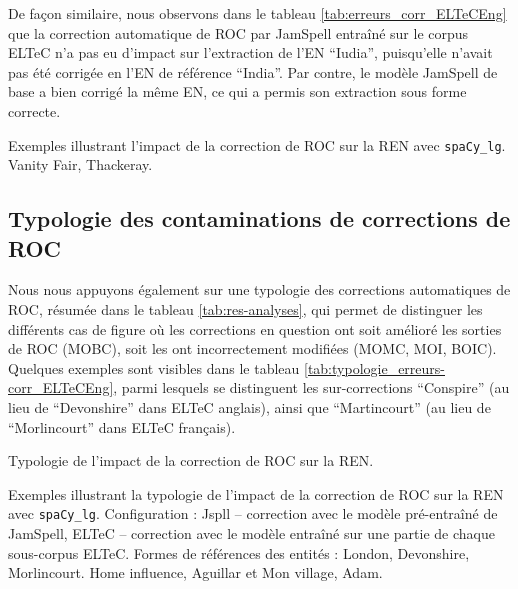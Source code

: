 De façon similaire, nous observons dans le tableau \ref{tab:erreurs_corr_ELTeCEng} que la correction automatique de ROC par JamSpell entraîné sur le corpus ELTeC n'a pas eu d'impact sur l'extraction de l'EN ``Iudia'', puisqu'elle n'avait pas été corrigée en l'EN de référence ``India''. Par contre, le modèle JamSpell de base a bien corrigé la même EN, ce qui a permis son extraction sous forme correcte.
\begin{table}[h!]
\small
    \centering
   
    \caption{Exemples illustrant l'impact de la correction de ROC sur la REN avec \texttt{spaCy\_lg}. {\normalfont Vanity Fair}, Thackeray.}
    \label{tab:erreurs_corr_ELTeCEng}
\end{table}


\subsection{Typologie des contaminations de corrections de ROC}
Nous nous appuyons également sur une typologie des corrections automatiques de ROC, résumée dans le tableau \ref{tab:res-analyses}, qui permet de distinguer les différents cas de figure où les corrections en question ont soit amélioré les sorties de ROC (MOBC), soit les ont incorrectement modifiées (MOMC, MOI, BOIC). Quelques exemples sont visibles dans le tableau \ref{tab:typologie_erreurs-corr_ELTeCEng}, 
parmi lesquels se distinguent les sur-corrections ``Conspire'' 
(au lieu de ``Devonshire'' 
dans ELTeC anglais), ainsi que ``Martincourt'' (au lieu de ``Morlincourt'' dans ELTeC français).



\begin{table}[h!]
\small
    \centering
    
    \caption{Typologie de l'impact de la correction de ROC sur la REN.  }
    \label{tab:res-analyses}
\end{table}

\begin{table}[h!]
\small
    \centering
   
    \caption{Exemples illustrant la typologie de l'impact de la correction de ROC sur la REN avec \texttt{spaCy\_lg}. Configuration : Jspll -- correction avec le modèle pré-entraîné de JamSpell, ELTeC -- correction avec le modèle entraîné sur une partie de chaque sous-corpus ELTeC. Formes de références des entités : London, Devonshire, Morlincourt. {\normalfont Home influence}, Aguillar et {\normalfont Mon village}, Adam.}
    \label{tab:typologie_erreurs-corr_ELTeCEng}
\end{table}

